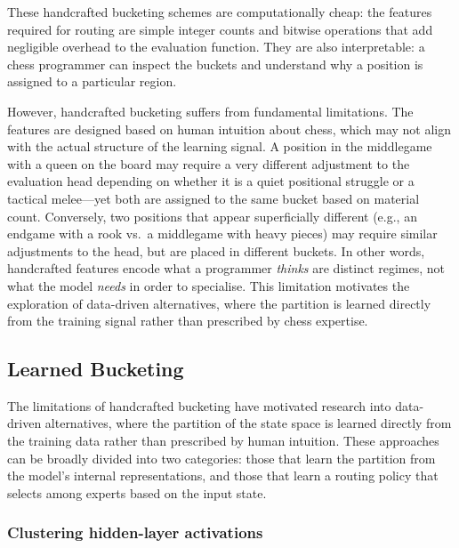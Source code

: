 These handcrafted bucketing schemes are computationally cheap: the features required for routing are simple integer counts and bitwise operations that add negligible overhead to the evaluation function. They are also interpretable: a chess programmer can inspect the buckets and understand why a position is assigned to a particular region.

However, handcrafted bucketing suffers from fundamental limitations. The features are designed based on human intuition about chess, which may not align with the actual structure of the learning signal. A position in the middlegame with a queen on the board may require a very different adjustment to the evaluation head depending on whether it is a quiet positional struggle or a tactical melee---yet both are assigned to the same bucket based on material count. Conversely, two positions that appear superficially different (e.g., an endgame with a rook vs.\ a middlegame with heavy pieces) may require similar adjustments to the head, but are placed in different buckets. In other words, handcrafted features encode what a programmer \emph{thinks} are distinct regimes, not what the model \emph{needs} in order to specialise. This limitation motivates the exploration of data-driven alternatives, where the partition is learned directly from the training signal rather than prescribed by chess expertise.

\subsection{Learned Bucketing}\label{sec:learned-bucketing}

The limitations of handcrafted bucketing have motivated research into data-driven alternatives, where the partition of the state space is learned directly from the training data rather than prescribed by human intuition. These approaches can be broadly divided into two categories: those that learn the partition from the model's internal representations, and those that learn a routing policy that selects among experts based on the input state.

\subsubsection{Clustering hidden-layer activations}\label{sec:act-clustering}

